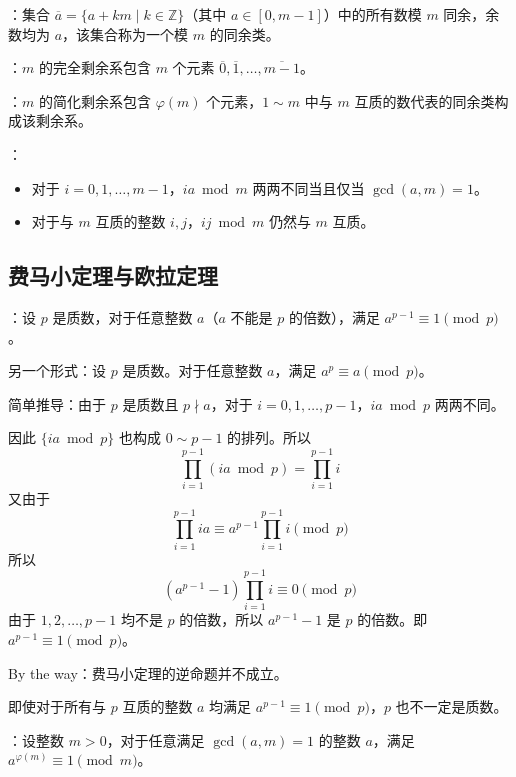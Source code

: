 ：集合 $\overline{a} = \{a + km \mid k \in \mathbb{Z}\}$（其中 $a\in [0, m - 1]$）中的所有数模 $m$ 同余，余数均为 $a$，该集合称为一个模 $m$ 的同余类。

：$m$ 的完全剩余系包含 $m$ 个元素 $\overline{0}, \overline{1}, \dots, \overline{m - 1}$。

：$m$ 的简化剩余系包含 $\varphi(m)$ 个元素，$1 \sim m$ 中与 $m$ 互质的数代表的同余类构成该剩余系。

：

\begin{itemize}
    \item 对于 $i = 0, 1, \dots, m - 1$，$ia \bmod m$ 两两不同当且仅当 $\gcd(a, m) = 1$。
    \item 对于与 $m$ 互质的整数 $i, j$，$ij \bmod m$ 仍然与 $m$ 互质。
\end{itemize}

\subsection{费马小定理与欧拉定理}

：设 $p$ 是质数，对于任意整数 $a$（$a$ 不能是 $p$ 的倍数），满足 $a^{p - 1} \equiv 1 \pmod p$。

\begin{quoteblock}
另一个形式：设 $p$ 是质数。对于任意整数 $a$，满足 $a^p \equiv a \pmod p$。
\end{quoteblock}

简单推导：由于 $p$ 是质数且 $p \nmid a$，对于 $i = 0, 1, \dots, p - 1$，$ia \bmod p$ 两两不同。

因此 $\{ ia \bmod p \}$ 也构成 $0 \sim p - 1$ 的排列。所以
\[
\prod_{i = 1}^{p - 1}(ia \bmod p) = \prod_{i = 1}^{p - 1} i
\]
又由于
\[
\prod_{i = 1}^{p - 1}ia \equiv a^{p - 1}\prod_{i = 1}^{p - 1} i \pmod p
\]
所以
\[
(a^{p - 1} - 1)\prod_{i = 1}^{p - 1}i \equiv 0 \pmod p
\]
由于 $1, 2, \dots, p - 1$ 均不是 $p$ 的倍数，所以 $a^{p - 1} - 1$ 是 $p$ 的倍数。即 $a^{p - 1}\equiv 1 \pmod p$。

\begin{quoteblock}
By the way：费马小定理的逆命题并不成立。

即使对于所有与 $p$ 互质的整数 $a$ 均满足 $a^{p - 1} \equiv 1 \pmod p$，$p$ 也不一定是质数。
\end{quoteblock}

：设整数 $m > 0$，对于任意满足 $\gcd(a, m) = 1$ 的整数 $a$，满足 $a^{\varphi(m)} \equiv 1 \pmod m$。

